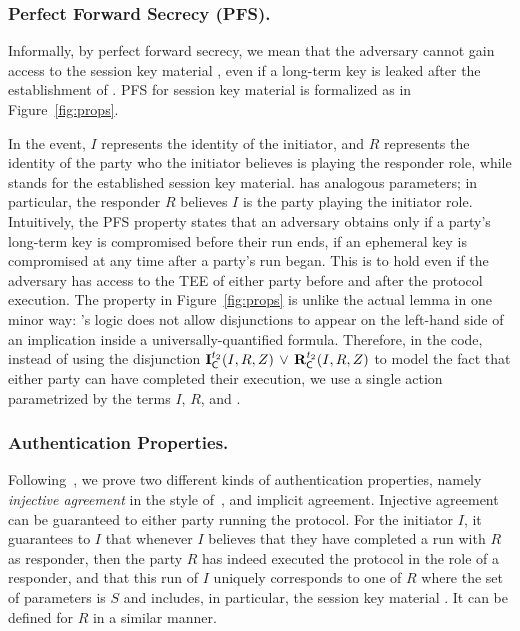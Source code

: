 \subsubsection{Perfect Forward Secrecy (PFS).}
\label{sec:secrecy}
Informally, by perfect forward secrecy, we mean that the adversary cannot
gain access to the session key material \mSessKey{}, even if a long-term key is
leaked after the establishment of \mSessKey{}.
%
PFS for session key material \mSessKey{} is formalized as \mPredPfs{}
in Figure~\ref{fig:props}.
%

In the \mIComplete{} event, $I$ represents the identity of the initiator,
and $R$ represents the identity of the party who the initiator believes is
playing the responder role, while \mSessKey{} stands for the established
session key material.
%
\mRComplete{} has analogous parameters; in particular, the responder $R$
believes $I$ is the party playing the initiator role.
%
Intuitively, the PFS property states that an adversary obtains \mSessKey{}
only if a party's long-term key is compromised before their run ends, if an
ephemeral key is compromised at any time after a party's run began.
%
This is to hold even if the adversary has access to the TEE of either party
before and after the protocol execution.
%
The property in Figure~\ref{fig:props} is unlike the actual \mTamarin{} lemma
in one minor way: \mTamarin's logic does not allow disjunctions to appear on
the left-hand side of an implication inside a universally-quantified formula.
%
Therefore, in the \mTamarin{} code, instead of using the disjunction
$\mathbf{I}_{\textsf{C}}^{t_2}(I, R, Z)\, \lor\,  \mathbf{R}_{\textsf{C}}^{t_2}(I, R, Z)$
to model the fact that either party can have completed their execution, we use
a single action parametrized by the terms $I$, $R$, and \mSessKey.

\subsubsection{Authentication Properties.}
\label{sec:authenticationDef}
Following~\cite{Norr21}, we prove two different kinds of authentication
properties, namely \emph{injective agreement} in the style
of~\cite{DBLP:conf/csfw/Lowe97a}, and implicit agreement.
%
Injective agreement can be guaranteed to either party running the protocol.
%
For the initiator $I$, it guarantees to $I$ that whenever $I$ believes that
they have completed a run with $R$ as responder, then the party $R$ has indeed
executed the protocol in the role of a responder, and that this run of $I$
uniquely corresponds to one of $R$ where the set of parameters is $S$ and
includes, in particular, the session key material \mSessKey{}.
%
It can be defined for $R$ in a similar manner.

